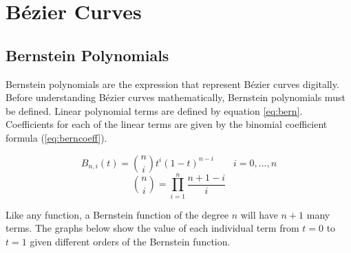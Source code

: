 \documentclass[12pt,letterpaper]{article}
\begin{document}
\section{B\'ezier Curves}

\subsection{Bernstein Polynomials}
Bernstein polynomials are the expression that represent B\'ezier curves digitally. Before understanding B\'ezier curves mathematically, Bernstein polynomials must be defined. Linear polynomial terms are defined by equation \ref{eq:bern}. Coefficients for each of the linear terms are given by the binomial coefficient formula (\ref{eq:berncoeff}). 

\begin{equation}
    \label{eq:bern}
    B_{n,i}(t) = \binom{n}{i} t^i (1-t)^{n-i} \qquad i=0,...,n
\end{equation}
\begin{equation}
    \label{eq:berncoeff}
    \binom{n}{i} = \prod_{i=1}^{n} \frac{n+1-i}{i}
\end{equation}

Like any function, a Bernstein function of the degree $n$ will have $n+1$ many terms. The graphs below show the value of each individual term from $t=0$ to $t=1$ given different orders of the Bernstein function. 
\end{document}
